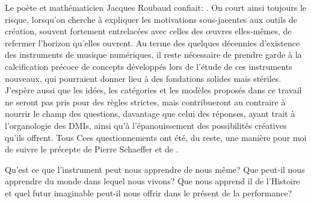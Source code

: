 \noindent Le poète et mathématicien Jacques Roubaud confiait: . On court ainsi toujours le risque, lorsqu'on cherche à expliquer les motivations sous-jacentes aux outils de création, souvent fortement entrelacées avec celles des œuvres elles-mêmes, de refermer l'horizon qu'elles ouvrent. 
Au terme des quelques décennies d'existence des instruments de musique numériques, il reste nécessaire de prendre garde à la calcification précoce de concepts développés lors de l'étude de ces instruments nouveaux, qui pourraient donner lieu à des fondations solides mais stériles. J'espère aussi que les idées, les catégories et les modèles proposés dans ce travail ne seront pas pris pour des règles strictes, mais contribueront au contraire à nourrir le champ des questions, davantage que celui des réponses, ayant trait à l'organologie des \glspl{DMI}, ainsi qu'à l'épanouissement des possibilités créatives qu'ils offrent. Tous Cces questionnements ont été, du reste, une manière pour moi de suivre le précepte de Pierre Schaeffer et de .


Qu'est ce que l'instrument peut nous apprendre de nous même? Que peut-il nous apprendre du monde dans lequel nous vivons? Que nous apprend il de l'Histoire et quel futur imaginable peut-il nous offrir dans le présent de la performance?


